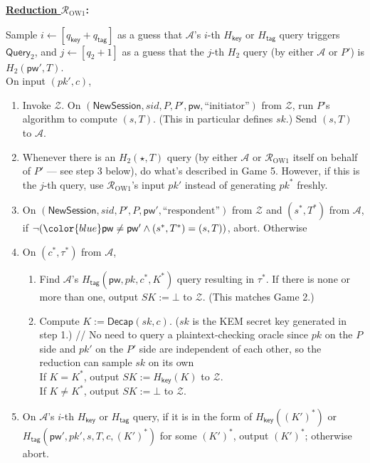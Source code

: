 \documentclass{article}
\theoremstyle{plain}
\theoremstyle{definition}
\theoremstyle{remark}
\newcommand{\adv}{\mathcal{A}}
\newcommand{\env}{\mathcal{Z}}
\newcommand{\red}{\mathcal{R}}
\newcommand{\Decap}{\mathsf{Decap}}
\newcommand{\Hkey}{H_\mathsf{key}}
\newcommand{\Htag}{H_\mathsf{tag}}
\newcommand{\pw}{\mathsf{pw}}
\newcommand{\NewSession}{\mathsf{NewSession}}
\newcommand{\qkey}{q_\mathsf{key}}
\newcommand{\qtag}{q_\mathsf{tag}}
\newcommand{\Query}{\mathsf{Query}}
\begin{document}
\medskip\noindent\textbf{\underline{Reduction $\red_\mathrm{OW1}$}:}

\medskip\noindent
Sample $i \gets [\qkey+\qtag]$ as a guess that $\adv$'s $i$-th $\Hkey$ or $\Htag$ query triggers $\Query_2$, {\color{blue}and $j \gets [q_2+1]$ as a guess that the $j$-th $H_2$ query (by either $\adv$ or $P'$) is $H_2(\pw',T)$}. \\
On input $(pk',c)$,
\begin{enumerate}
  \item Invoke $\env$. On $(\NewSession, sid, P, P', \pw, \text{``initiator''})$ from $\env$, run $P$'s algorithm to compute $(s,T)$. (This in particular defines $sk$.) Send $(s,T)$ to $\adv$.
  \item {\color{blue}Whenever there is an $H_2(\star,T)$ query (by either $\adv$ or $\red_\mathrm{OW1}$ itself on behalf of $P'$ --- see step 3 below), do what's described in Game 5. However, if this is the $j$-th query, use $\red_\mathrm{OW1}$'s input $pk'$ instead of generating $pk^*$ freshly.}
  \item On $(\NewSession, sid, P', P, \pw', \text{``respondent''})$ from $\env$ and $(s^*,T^*)$ from $\adv$, if $\neg({\color{blue}\pw \neq \pw'} \land (s^*,T^*) = (s,T))$, abort. Otherwise
  \item On $(c^*,\tau^*)$ from $\adv$,
      \begin{enumerate}
        \item Find $\adv$'s $\Htag(\pw,pk,c^*,K^*)$ query resulting in $\tau^*$. If there is none or more than one, output $SK := \bot$ to $\env$. (This matches Game 2.)
        \item {\color{blue}Compute $K := \Decap(sk,c)$. ($sk$ is the KEM secret key generated in step 1.)} \quad \textcolor[gray]{0.5}{// No need to query a plaintext-checking oracle since $pk$ on the $P$ side and $pk'$ on the $P'$ side are independent of each other, so the reduction can sample $sk$ on its own} \\
            If {\color{blue}$K = K^*$}, output $SK := \Hkey(K)$ to $\env$. \\
            If {\color{blue}$K \neq K^*$}, output $SK := \bot$ to $\env$.
      \end{enumerate}
  \item On $\adv$'s $i$-th $\Hkey$ or $\Htag$ query, if it is in the form of $\Hkey((K')^*)$ or $\Htag(\pw',pk',s,T,c,(K')^*)$ for some $(K')^*$, output $(K')^*$; otherwise abort.
\end{enumerate}
\end{document}
